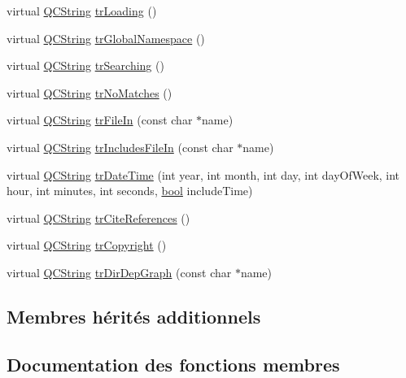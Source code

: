 \begin{DoxyCompactItemize}
\item 
virtual \hyperlink{class_q_c_string}{Q\+C\+String} \hyperlink{class_translator_indonesian_a1e19f2b2373ba892c82929021c91ecd6}{tr\+Loading} ()
\item 
virtual \hyperlink{class_q_c_string}{Q\+C\+String} \hyperlink{class_translator_indonesian_a13b2a122f31b14cd56ea93380a9410da}{tr\+Global\+Namespace} ()
\item 
virtual \hyperlink{class_q_c_string}{Q\+C\+String} \hyperlink{class_translator_indonesian_a3158ca0a6ae8c1d65e5fe214d17e2a60}{tr\+Searching} ()
\item 
virtual \hyperlink{class_q_c_string}{Q\+C\+String} \hyperlink{class_translator_indonesian_ae678b749dff3e7dcf0a5eeea348d33b5}{tr\+No\+Matches} ()
\item 
virtual \hyperlink{class_q_c_string}{Q\+C\+String} \hyperlink{class_translator_indonesian_acf2807ec680e81bc2fa0070e3240ccb0}{tr\+File\+In} (const char $\ast$name)
\item 
virtual \hyperlink{class_q_c_string}{Q\+C\+String} \hyperlink{class_translator_indonesian_af7933fe57ee5754ad214b9363f5ee7c1}{tr\+Includes\+File\+In} (const char $\ast$name)
\item 
virtual \hyperlink{class_q_c_string}{Q\+C\+String} \hyperlink{class_translator_indonesian_a26efccc2faab1ef41c88d88c8f4c6bfc}{tr\+Date\+Time} (int year, int month, int day, int day\+Of\+Week, int hour, int minutes, int seconds, \hyperlink{qglobal_8h_a1062901a7428fdd9c7f180f5e01ea056}{bool} include\+Time)
\item 
virtual \hyperlink{class_q_c_string}{Q\+C\+String} \hyperlink{class_translator_indonesian_a01b4e8366fc01f5cf4b75209f245317f}{tr\+Cite\+References} ()
\item 
virtual \hyperlink{class_q_c_string}{Q\+C\+String} \hyperlink{class_translator_indonesian_a63d763f3ecdeb38fc19708335f302970}{tr\+Copyright} ()
\item 
virtual \hyperlink{class_q_c_string}{Q\+C\+String} \hyperlink{class_translator_indonesian_a113500839044910b005d06b9567388aa}{tr\+Dir\+Dep\+Graph} (const char $\ast$name)
\end{DoxyCompactItemize}
\subsection*{Membres hérités additionnels}


\subsection{Documentation des fonctions membres}
\hypertarget{class_translator_indonesian_a9cce3baab6f6f8035efb9581b22c96dd}{}

